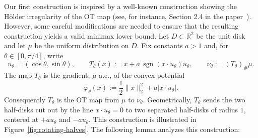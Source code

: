 \documentclass[11pt,twoside]{article}
\DeclareMathOperator{\sgn}{sgn}
\begin{document}
Our first construction is inspired by a well-known construction showing the H\"{o}lder irregularity of the OT map (see, for instance, Section 2.4 in the paper~\cite{letrouit2025lectures}). However, some careful modifications are needed to ensure that the resulting construction yields a valid minimax lower bound. 
Let $D\subset\mathbb R^2$ be the unit disk and let $\mu$ be the uniform distribution on $D$. Fix constants $a > 1$ and, for $\theta\in[0,\pi/4]$, write
\[
u_\theta=(\cos\theta,\sin\theta),
\qquad
T_\theta(x):= x+a\,\sgn(x\cdot u_\theta)u_\theta,
\qquad
\nu_\theta:=(T_\theta)_\#\mu.
\]
The map $T_\theta$ is the gradient, $\mu$-a.e., of the convex potential
\[
\varphi_\theta(x):=\frac{1}{2}\|x\|_2^2+a|x\cdot u_\theta|.
\]
Consequently $T_\theta$ is the OT map from $\mu$ to $\nu_\theta$. Geometrically, $T_\theta$ sends the two half-disks cut out by the line $x\cdot u_\theta=0$ to two separated half-disks of radius $1$, centered at $+ a u_\theta$ and $- a u_\theta$. This construction is illustrated in Figure~\ref{fig:rotating-halves}. The following lemma analyzes this construction: 
\end{document}

